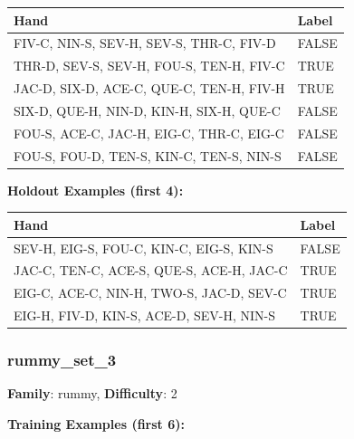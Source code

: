 \documentclass[10pt,a4paper]{article}
\begin{document}
\begin{small}
\begin{tabular}{p{8cm}l}
\toprule
Hand & Label \\
\midrule
FIV-C, NIN-S, SEV-H, SEV-S, THR-C, FIV-D & \textcolor{negative}{FALSE} \\
THR-D, SEV-S, SEV-H, FOU-S, TEN-H, FIV-C & \textcolor{positive}{TRUE} \\
JAC-D, SIX-D, ACE-C, QUE-C, TEN-H, FIV-H & \textcolor{positive}{TRUE} \\
SIX-D, QUE-H, NIN-D, KIN-H, SIX-H, QUE-C & \textcolor{negative}{FALSE} \\
FOU-S, ACE-C, JAC-H, EIG-C, THR-C, EIG-C & \textcolor{negative}{FALSE} \\
FOU-S, FOU-D, TEN-S, KIN-C, TEN-S, NIN-S & \textcolor{negative}{FALSE} \\
\bottomrule
\end{tabular}
\end{small}

\textbf{Holdout Examples (first 4):}

\begin{small}
\begin{tabular}{p{8cm}l}
\toprule
Hand & Label \\
\midrule
SEV-H, EIG-S, FOU-C, KIN-C, EIG-S, KIN-S & \textcolor{negative}{FALSE} \\
JAC-C, TEN-C, ACE-S, QUE-S, ACE-H, JAC-C & \textcolor{positive}{TRUE} \\
EIG-C, ACE-C, NIN-H, TWO-S, JAC-D, SEV-C & \textcolor{positive}{TRUE} \\
EIG-H, FIV-D, KIN-S, ACE-D, SEV-H, NIN-S & \textcolor{positive}{TRUE} \\
\bottomrule
\end{tabular}
\end{small}

\vspace{0.5cm}

\subsubsection{rummy\_set\_3}

\textbf{Family}: rummy, \textbf{Difficulty}: 2

\textbf{Training Examples (first 6):}
\end{document}
